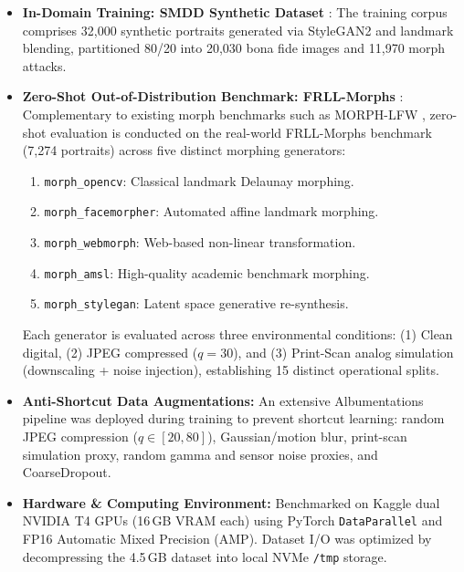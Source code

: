 \documentclass[11pt,a4paper]{article}
\begin{document}
\begin{itemize}[leftmargin=*]
    \item \textbf{In-Domain Training: SMDD Synthetic Dataset} \cite{damer2022smdd}: The training corpus comprises 32,000 synthetic portraits generated via StyleGAN2 and landmark blending, partitioned 80/20 into 20,030 bona fide images and 11,970 morph attacks.
    \item \textbf{Zero-Shot Out-of-Distribution Benchmark: FRLL-Morphs} \cite{debruine2017face}: Complementary to existing morph benchmarks such as MORPH-LFW \cite{damer2021morph}, zero-shot evaluation is conducted on the real-world FRLL-Morphs benchmark (7,274 portraits) across five distinct morphing generators:
    \begin{enumerate}
        \item \texttt{morph\_opencv}: Classical landmark Delaunay morphing.
        \item \texttt{morph\_facemorpher}: Automated affine landmark morphing.
        \item \texttt{morph\_webmorph}: Web-based non-linear transformation.
        \item \texttt{morph\_amsl}: High-quality academic benchmark morphing.
        \item \texttt{morph\_stylegan}: Latent space generative re-synthesis.
    \end{enumerate}
    Each generator is evaluated across three environmental conditions: (1) Clean digital, (2) JPEG compressed ($q=30$), and (3) Print-Scan analog simulation (downscaling + noise injection), establishing 15 distinct operational splits.
    \item \textbf{Anti-Shortcut Data Augmentations:} An extensive Albumentations pipeline was deployed during training to prevent shortcut learning: random JPEG compression ($q \in [20, 80]$), Gaussian/motion blur, print-scan simulation proxy, random gamma and sensor noise proxies, and CoarseDropout.
    \item \textbf{Hardware & Computing Environment:} Benchmarked on Kaggle dual NVIDIA T4 GPUs (16\,GB VRAM each) using PyTorch \texttt{DataParallel} and FP16 Automatic Mixed Precision (AMP). Dataset I/O was optimized by decompressing the 4.5\,GB dataset into local NVMe \texttt{/tmp} storage.
\end{itemize}

\end{document}
